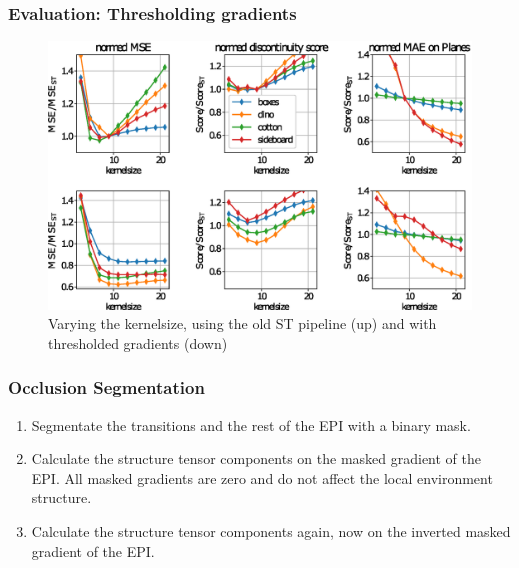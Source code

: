\documentclass[11pt]{beamer}
\begin{document}
\begin{frame}
\frametitle{ Evaluation: Thresholding gradients}
\begin{figure}
\centering
\includegraphics[width=1\linewidth]{images/old_outer}
\caption[Varying kernelsize]{Varying the kernelsize, using the old ST pipeline (up) and with thresholded gradients (down)}
\label{fig:oldouter}
\end{figure}
\end{frame}


\begin{frame}
\frametitle{Occlusion Segmentation}
\begin{enumerate}
	\item Segmentate the transitions and the rest of the EPI with a binary mask.
	\item Calculate the structure tensor components on the masked gradient of the EPI. All masked gradients are zero and do not affect the local environment structure.
	\item Calculate the structure tensor components again, now on the inverted masked gradient of the EPI.
\end{enumerate}
\end{frame}
\end{document}
